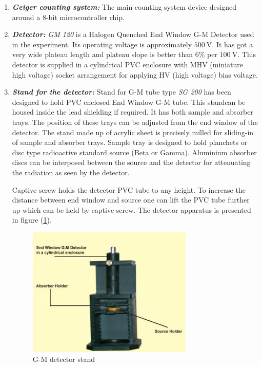 \documentclass[%
 reprint,
nofootinbib,
 amsmath,amssymb,
 aps,
floatfix,
]{revtex4-2}
\begin{document}
    \begin{enumerate}
        \item \textbf{\textit{Geiger counting system:}} The main counting system device designed around a 8-bit microcontroller chip. 
        \item \textbf{\textit{Detector:}} \textit{GM 120} is a Halogen Quenched End Window G-M Detector used in the experiment.  Its operating voltage is approximately $\SI{500}{\volt}$. It has got a very wide plateau length and plateau slope is better than 6\% per $\SI{100}{\volt}$. This detector is supplied in a cylindrical PVC enclosure with MHV (miniature high voltage) socket arrangement for applying HV (high voltage) bias voltage.
        \item \textbf{\textit{Stand for the detector:}} Stand for G-M tube type \textit{SG 200} has been designed to hold PVC enclosed End Window G-M tube. This standcan be housed inside the lead shielding if required. It has both   sample and absorber trays. The position of these trays can be  adjusted from the end window of the detector. The stand made up  of acrylic sheet is precisely milled for sliding-in of sample and absorber trays. Sample tray is designed to hold planchets or disc  type radioactive standard source (Beta or Gamma). Aluminium absorber discs can be interposed between the source and the detector for attenuating the radiation as seen by the detector.
        \par
        Captive screw holds the detector PVC tube to any height. To increase the distance between end window and source one can lift the PVC tube further up which can be held by captive screw. The detector apparatus is presented in figure (\ref{fig:stand}).
        \begin{figure}
            \centering
            \includegraphics[scale = 0.9]{Figures/detector stand.png}
            \caption{G-M detector stand}
            \label{fig:stand}
        \end{figure}

\end{enumerate}
\end{document}
